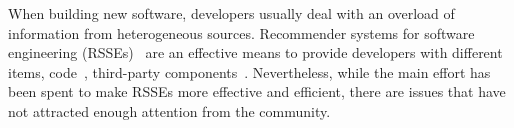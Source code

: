 









When building new software, developers usually deal with %
an overload of information %
from heterogeneous sources. %
Recommender systems for software engineering (RSSEs)~\cite{DBLP:books/sp/rsse2014} are an effective means %
to provide developers with %
different items, \eg code~\cite{Fowkes:2016:PPA:2950290.2950319,Nguyen:2019:FRS:3339505.3339636}, third-party components~\cite{NGUYEN2019110460,Ouni:2017:SSL:3032135.3032325}. %
Nevertheless, while the main effort has been spent to make RSSEs more effective and efficient, there are issues %
that have not attracted enough attention from the community. %

